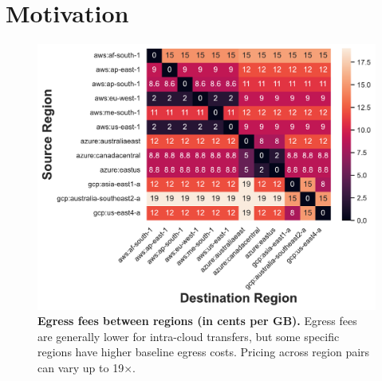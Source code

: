 \section{Motivation}





\begin{figure}[t]
     \centering
     \includegraphics[width=\linewidth]{figures/cost_heatmap.pdf}
     \caption{\textbf{Egress fees between regions (in cents per GB).} Egress fees are generally lower for intra-cloud transfers, but some specific regions have higher baseline egress costs. Pricing across region pairs can vary up to 19$\times$.  }
     \label{fig:cost_heatmap}
\end{figure}





